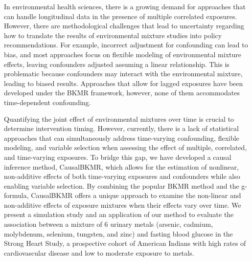 In environmental health sciences, there is a growing demand for approaches that can handle longitudinal data in the presence of multiple correlated exposures. However, there are methodological challenges that lead to uncertainty regarding how to translate the results of environmental mixture studies into policy recommendations. For example, incorrect adjustment for confounding can lead to bias, and most approaches focus on flexible modeling of environmental mixture effects, leaving confounders adjusted assuming a linear relationship. This is problematic because confounders may interact with the environmental mixture, leading to biased results. Approaches that allow for lagged exposures have been developed under the BKMR framework, however, none of them accommodates time-dependent confounding.

Quantifying the joint effect of environmental mixtures over time is crucial to determine intervention timing. However, currently, there is a lack of statistical approaches that can simultaneously address time-varying confounding, flexible modeling, and variable selection when assessing the effect of multiple, correlated, and time-varying exposures. To bridge this gap, we have developed a causal inference method, CausalBKMR, which allows for the estimation of nonlinear, non-additive effects of both time-varying exposures and confounders while also enabling variable selection. By combining the popular BKMR method and the g-formula, CausalBKMR offers a unique approach to examine the non-linear and non-additive effects of exposure mixtures when their effects vary over time. We present a simulation study and an application of our method to evaluate the association between a mixture of 6 urinary metals (arsenic, cadmium, molybdenum, selenium, tungsten, and zinc) and fasting blood glucose in the Strong Heart Study, a prospective cohort of American Indians with high rates of cardiovascular disease and low to moderate exposure to metals.
